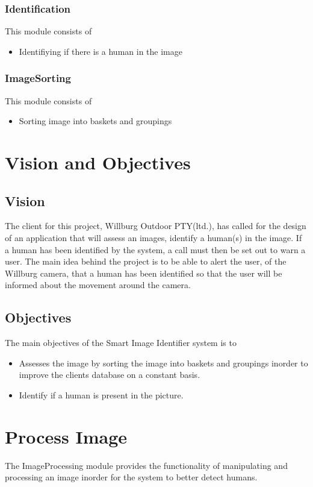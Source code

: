 \documentclass[a4paper,12pt]{report}
\begin{document}
	\subsubsection {Identification}
		This module consists of
			\begin {itemize}
				\item Identifiying if there is a human in the image
			\end {itemize}

	\subsubsection {ImageSorting}
		This module consists of
			\begin {itemize}
				\item Sorting image into baskets and groupings
			\end {itemize}


\section {Vision and Objectives}
	\subsection {Vision}
	 The client for this project, Willburg Outdoor PTY(ltd.), has called for the design of an application that will assess an images, 	identify a human(s) in the image. If a human has been identified by the system, a call must then be set out to warn a user. The main idea behind the project is to be able to alert the user, of the Willburg camera, that a human has been identified so that the user will be informed about the movement around the camera.

	\subsection {Objectives}
	The main objectives of the Smart Image Identifier system is to
	\begin {itemize}
		\item Assesses the image by sorting the image into baskets and groupings inorder to improve the clients database on a constant basis.
		\item Identify if a human is present in the picture.
	\end {itemize}


\section {Process Image}
The ImageProcessing module provides the functionality of manipulating and processing an image inorder for the system to better detect  humans.
	\FloatBarrier
\end{document}
